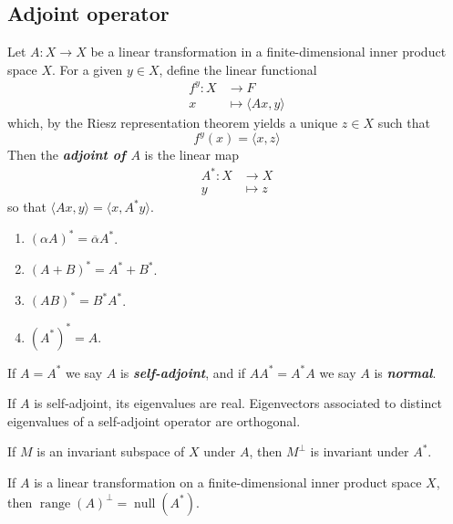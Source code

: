 \documentclass{article}
\theoremstyle{definition}
\numberwithin{equation}{section}
\begin{document}
	\subsection{Adjoint operator}
	 Let $A:X\to X$ be a linear transformation in a finite-dimensional inner product space $X$. For a given $y\in X$, define the linear functional
	\begin{align*}
		f^y:X&\to F\\
		x&\mapsto\langle Ax,y\rangle
	\end{align*}
	which, by the Riesz representation theorem yields a unique $z\in X$ such that
	\[f^y(x)=\langle x,z\rangle\]
	Then the \textbf{\textit{adjoint of $A$}} is the linear map
	\begin{align*}
		A^*:X&\to X\\
		y&\mapsto z
	\end{align*}
	so that $\langle Ax,y\rangle=\langle x,A^*y\rangle$.
	\begin{prop}\leavevmode
		\begin{enumerate}
			\item $(\alpha A)^*=\overline{\alpha}A^*$.
			\item $(A+B)^*=A^*+B^*$.
			\item $(AB)^*=B^*A^*$.
			\item $(A^*)^*=A$.
		\end{enumerate}
	\end{prop}
	If $A=A^*$ we say $A$ is \textbf{\textit{self-adjoint}}, and if $AA^*=A^*A$ we say $A$ is \textbf{\textit{normal}}.
	\begin{thm}
		If $A$ is self-adjoint, its eigenvalues are real. Eigenvectors associated to distinct eigenvalues of a self-adjoint operator are orthogonal.
	\end{thm}
	\begin{thm}
		If $M$ is an invariant subspace of $X$ under $A$, then $M^\perp$ is invariant under $A^*$.
	\end{thm}
	\begin{thm}
		If $A$ is a linear transformation on a finite-dimensional inner product space $X$, then $\operatorname{range} (A)^\perp=\operatorname{null}(A^*)$.
	\end{thm}
	
\end{document}
